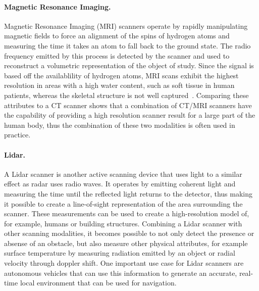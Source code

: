 \paragraph{Magnetic Resonance Imaging. }  Magnetic Resonance Imaging (MRI) scanners operate by rapidly manipulating magnetic fields to force an alignment of the spins of hydrogen atoms and measuring the time it takes an atom to fall back to the ground state.  The radio frequency emitted by this process is detected by the scanner and used to reconstruct a  volumetric representation of the object of study.  Since the signal is based off the availablility of hydrogen atoms, MRI scans exhibit the highest resolution in areas with a high water content, such as soft tissue in human patients, whereas the skeletal structure is not well captured~\cite{damadian1971tumor}.  Comparing these attributes to a CT scanner shows that a combination of CT/MRI scanners have the capability of providing a high resolution scanner result for a large part of the human body, thus the combination of these two modalities is often used in practice.

\paragraph{Lidar. }  A Lidar scanner is another active scanning device that uses light to a similar effect as radar uses radio waves.  It operates by emitting coherent light and measuring the time until the reflected light returns to the detector, thus making it possible to create a  line-of-sight representation of the area surrounding the scanner.  These measurements can be used to create a high-resolution  model of, for example, humans or building structures.  Combining a Lidar scanner with other scanning modalities, it becomes possible to not only detect the presence or absense of an obstacle, but also measure other physical attributes, for example surface temperature by measuring radiation emitted by an object or radial velocity through doppler shift.  One important use case for Lidar scanners are autonomous vehicles that can use this information to generate an accurate, real-time  local environment that can be used for navigation.

